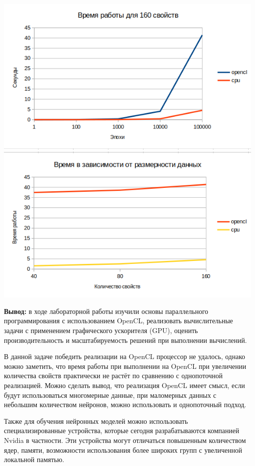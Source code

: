\documentclass[a4paper,14pt]{extarticle}
\begin{document}
\begin{center}
    \includegraphics[width=140mm]{exp_160}\\
    \includegraphics[width=140mm]{exp_diff_props}\\
\end{center}


\textbf{Вывод: } в ходе лабораторной работы изучили основы параллельного программирования с использованием OpenCL,
реализовать вычислительные задачи с применением графического ускорителя (GPU), оценить
производительность и масштабируемость решений при выполнении вычислений.

В данной задаче победить реализации на OpenCL процессор не удалось, однако
можно заметить, что время работы при выполнении на OpenCL при увеличении
количества свойств практически не растёт по сравнению с однопоточной реализацией.
Можно сделать вывод, что реализация OpenCL имеет смысл, если будут использоваться
многомерные данные, при маломерных данных с небольшим количеством нейронов, 
можно использовать и однопоточный подход.

Также для обучения нейронных моделей можно использовать специализированные
устройства, которые сегодня разрабатываются компанией Nvidia в частности. 
Эти устройства могут отличаться повышенным количеством ядер, памяти, 
возможности использования более широких групп с увеличенной локальной памятью.
\end{document}
